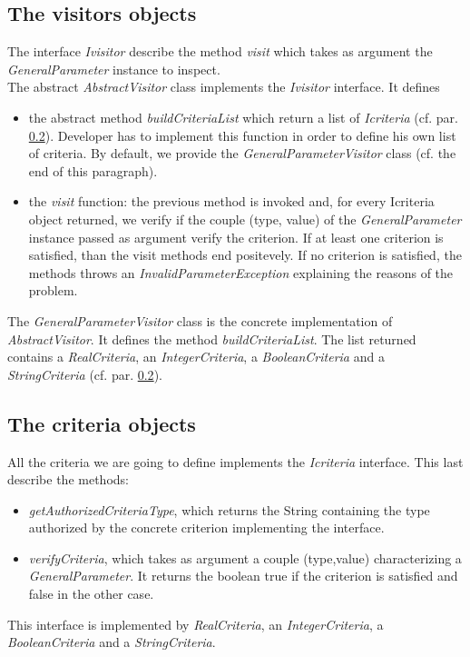 \documentclass[a4paper,11pt] {ivoa}
\begin{document}
\subsection{The visitors objects}
The interface {\it Ivisitor} describe the method {\it visit} which takes as argument the {\it GeneralParameter} instance to inspect.\\
The abstract {\it AbstractVisitor} class implements the {\it Ivisitor} interface. It defines 
\begin{itemize}
\item the abstract method {\it buildCriteriaList} which return a list of {\it Icriteria} (cf. par. \ref{criteria}). Developer has to implement this function in order to define his own list of criteria. By default, we provide the {\it GeneralParameterVisitor} class (cf. the end of this paragraph).
\item the {\it visit} function: the previous method is invoked and, for every {Icriteria} object returned, we verify if the couple (type, value) of the {\it GeneralParameter} instance passed as argument verify the criterion. If at least one criterion is satisfied, than the visit methods end positevely. If no criterion is satisfied, the methods throws an {\it InvalidParameterException} explaining the reasons of the problem.
\end{itemize}
The {\it GeneralParameterVisitor} class is the concrete implementation of {\it AbstractVisitor}. It defines the method {\it buildCriteriaList}. The list returned contains a {\it RealCriteria}, an {\it IntegerCriteria}, a {\it BooleanCriteria} and a {\it StringCriteria} (cf. par. \ref{criteria}).  

\subsection{The criteria objects}\label{criteria}
All the criteria we are going to define implements the {\it Icriteria} interface. This last describe the methods:
\begin{itemize}
\item {\it getAuthorizedCriteriaType}, which returns the String containing the type authorized by the concrete criterion implementing the interface.
\item {\it verifyCriteria}, which takes as argument a couple (type,value) characterizing a {\it GeneralParameter}. It returns the boolean true if the criterion is satisfied and false in the other case.
\end{itemize}
This interface is implemented by {\it RealCriteria}, an {\it IntegerCriteria}, a {\it BooleanCriteria} and a {\it StringCriteria}.
\end{document}
